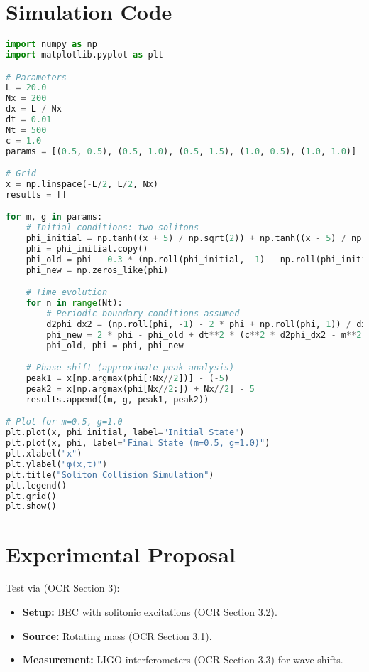 \documentclass{article}
\begin{document}
\section{Simulation Code}
\begin{lstlisting}[language=Python, caption=Soliton Collision Simulation, label=lst:soliton]
import numpy as np
import matplotlib.pyplot as plt

# Parameters
L = 20.0
Nx = 200
dx = L / Nx
dt = 0.01
Nt = 500
c = 1.0
params = [(0.5, 0.5), (0.5, 1.0), (0.5, 1.5), (1.0, 0.5), (1.0, 1.0)]

# Grid
x = np.linspace(-L/2, L/2, Nx)
results = []

for m, g in params:
    # Initial conditions: two solitons
    phi_initial = np.tanh((x + 5) / np.sqrt(2)) + np.tanh((x - 5) / np.sqrt(2))
    phi = phi_initial.copy()
    phi_old = phi - 0.3 * (np.roll(phi_initial, -1) - np.roll(phi_initial, 1)) / (2 * dx) * dt  # v = 0.3, -0.3
    phi_new = np.zeros_like(phi)

    # Time evolution
    for n in range(Nt):
        # Periodic boundary conditions assumed
        d2phi_dx2 = (np.roll(phi, -1) - 2 * phi + np.roll(phi, 1)) / dx**2
        phi_new = 2 * phi - phi_old + dt**2 * (c**2 * d2phi_dx2 - m**2 * phi - g * phi**3)
        phi_old, phi = phi, phi_new

    # Phase shift (approximate peak analysis)
    peak1 = x[np.argmax(phi[:Nx//2])] - (-5)
    peak2 = x[np.argmax(phi[Nx//2:]) + Nx//2] - 5
    results.append((m, g, peak1, peak2))

# Plot for m=0.5, g=1.0
plt.plot(x, phi_initial, label="Initial State")
plt.plot(x, phi, label="Final State (m=0.5, g=1.0)")
plt.xlabel("x")
plt.ylabel("φ(x,t)")
plt.title("Soliton Collision Simulation")
plt.legend()
plt.grid()
plt.show()
\end{lstlisting}

\section{Experimental Proposal}
Test via (OCR Section 3):
\begin{itemize}
    \item \textbf{Setup:} BEC with solitonic excitations (OCR Section 3.2).
    \item \textbf{Source:} Rotating mass (OCR Section 3.1).
    \item \textbf{Measurement:} LIGO interferometers (OCR Section 3.3) for wave shifts.
\end{itemize}
\end{document}
